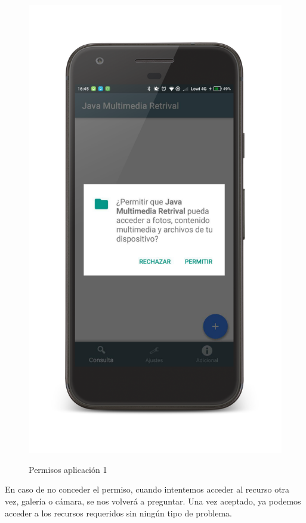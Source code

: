 \begin{figure}[H] %
\centering
\includegraphics[scale=0.15]{imagenes/permisos1.png}  %
\label{permisos1.png}
\caption{Permisos aplicación 1}
\end{figure}

En caso de no conceder el permiso, cuando intentemos acceder al recurso otra vez, galería o cámara, se nos volverá a preguntar. Una vez aceptado, ya podemos acceder a los recursos requeridos sin ningún tipo de problema.

